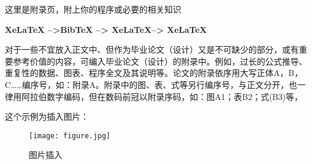 \Appendix
这里是附录页，附上你的程序或必要的相关知识

\bf\songti\color{red}{若要生成目录和参考文献的编译方式:} \color{black}XeLaTeX -->BibTeX --> XeLaTeX--> XeLaTeX

\songti
对于一些不宜放入正文中、但作为毕业论文（设计）又是不可缺少的部分，或有重要参考价值的内容，可编入毕业论文（设计）的附录中。例如，过长的公式推导、重复性的数据、图表、程序全文及其说明等。论文的附录依序用大写正体A，B，C……编序号，如：附录A。附录中的图、表、式等另行编序号，与正文分开，也一律用阿拉伯数字编码，但在数码前冠以附录序码，如：图A1；表B2；式(B3)等，

这个示例为插入图片：
\begin{figure}[H]
	\centering
	\texttt{[image: figure.jpg]}%
	\caption{图片插入\label{fig:fig}}
\end{figure}